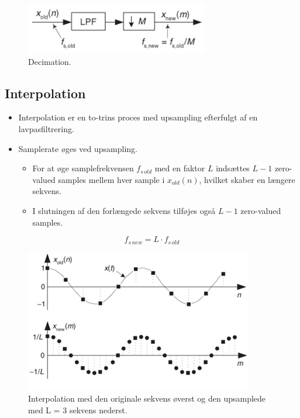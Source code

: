 \documentclass[danish]{article}
\begin{document}
\begin{figure}[H]
	\centering
	\includegraphics[width=0.4\linewidth]{graphics/decimation2}
	\caption{Decimation.}
	\label{fig:decimation2}
\end{figure}


\subsection{Interpolation}

\begin{itemize}
	\item Interpolation er en to-trins proces med upsampling efterfulgt af en lavpasfiltrering.
	\item Samplerate øges ved upsampling.
	\begin{itemize}
		\item 	For at øge samplefrekvensen $f_{s\, old}$ med en faktor $L$ indsættes $L-1$ zero-valued samples mellem hver sample i $x_{old}(n)$, hvilket skaber en længere sekvens. 
		\item I slutningen af den forlængede sekvens tilføjes også $L-1$ zero-valued samples.
	\end{itemize}
\end{itemize}

\begin{equation}
f_{s\, new} = L \cdot f_{s\, old}
\end{equation}

\begin{figure}[H]
	\centering
	\includegraphics[width=0.6\linewidth]{graphics/interpolation}
	\caption{Interpolation med den originale sekvens øverst og den upsamplede med L = 3 sekvens nederst.}
	\label{fig:interpolation}
\end{figure}
\end{document}
